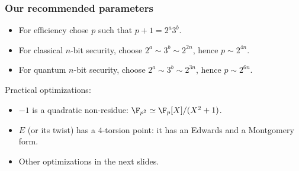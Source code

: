 \documentclass{beamer}
\begin{document}
\begin{frame}
  \frametitle{Our recommended parameters}
  
  \begin{itemize}
  \item For efficiency chose $p$ such that \alert{$p+1 = 2^a3^b$}.
  \item For classical $n$-bit security, choose \alert{$2^a\sim3^b\sim2^{2n}$}, hence \alert{$p\sim2^{4n}$}.
  \item For quantum $n$-bit security, choose \alert{$2^a\sim3^b\sim2^{3n}$}, hence \alert{$p\sim2^{6n}$}.
  \end{itemize}

  \begin{block}{Practical optimizations:}
    \begin{itemize}
    \item $-1$ is a quadratic non-residue: \alert{$\F_{p^2}\simeq\F_p[X]/(X^2+1)$}.
    \item $E$ (or its twist) has a $4$-torsion point: it has an
      \alert{Edwards} and a \alert{Montgomery} form.
    \item Other optimizations in the next slides.
    \end{itemize}
  \end{block}

\end{frame}

\end{document}
